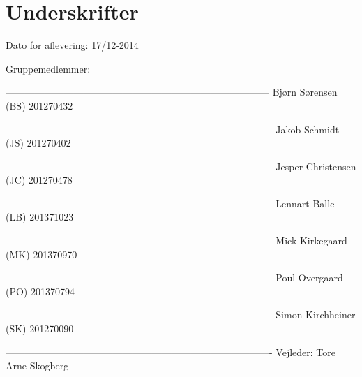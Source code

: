 \chapter*{Underskrifter}

Dato for aflevering: 17/12-2014

Gruppemedlemmer:\newline


--------------------------------------------------------------------------------- \newline
Bjørn Sørensen (BS) 201270432\newline


----------------------------------------------------------------------------------\newline
Jakob Schmidt (JS) 201270402\newline


----------------------------------------------------------------------------------\newline
Jesper Christensen (JC) 201270478\newline


----------------------------------------------------------------------------------\newline
Lennart Balle (LB) 201371023\newline


----------------------------------------------------------------------------------\newline
Mick Kirkegaard (MK) 201370970\newline


----------------------------------------------------------------------------------\newline
Poul Overgaard (PO) 201370794\newline


----------------------------------------------------------------------------------\newline
Simon Kirchheiner (SK) 201270090\newline









----------------------------------------------------------------------------------\newline
Vejleder: Tore Arne Skogberg\newline
